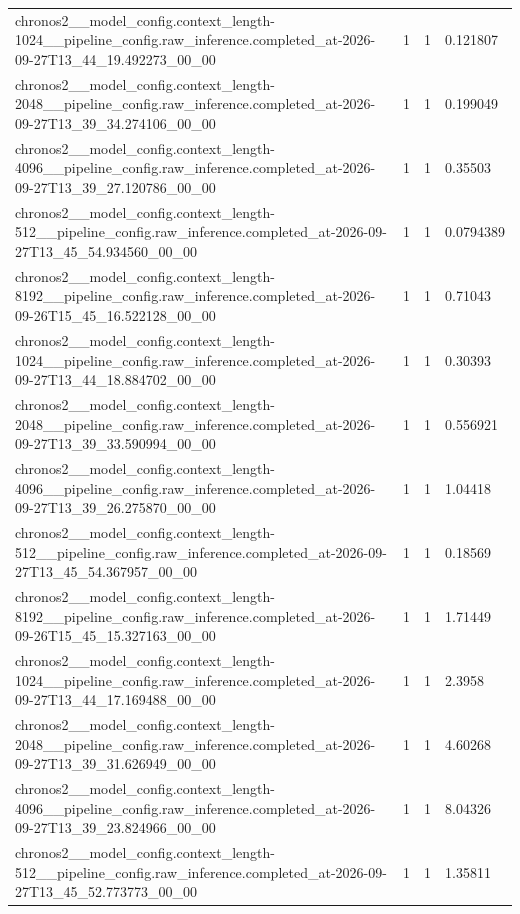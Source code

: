 \begin{tabular}{llll}
chronos2\_\_model\_config.context\_length-1024\_\_pipeline\_config.raw\_inference.completed\_at-2026-09-27T13\_44\_19.492273\_00\_00 & 1 & 1 & 0.121807 \\
chronos2\_\_model\_config.context\_length-2048\_\_pipeline\_config.raw\_inference.completed\_at-2026-09-27T13\_39\_34.274106\_00\_00 & 1 & 1 & 0.199049 \\
chronos2\_\_model\_config.context\_length-4096\_\_pipeline\_config.raw\_inference.completed\_at-2026-09-27T13\_39\_27.120786\_00\_00 & 1 & 1 & 0.35503 \\
chronos2\_\_model\_config.context\_length-512\_\_pipeline\_config.raw\_inference.completed\_at-2026-09-27T13\_45\_54.934560\_00\_00 & 1 & 1 & 0.0794389 \\
chronos2\_\_model\_config.context\_length-8192\_\_pipeline\_config.raw\_inference.completed\_at-2026-09-26T15\_45\_16.522128\_00\_00 & 1 & 1 & 0.71043 \\
chronos2\_\_model\_config.context\_length-1024\_\_pipeline\_config.raw\_inference.completed\_at-2026-09-27T13\_44\_18.884702\_00\_00 & 1 & 1 & 0.30393 \\
chronos2\_\_model\_config.context\_length-2048\_\_pipeline\_config.raw\_inference.completed\_at-2026-09-27T13\_39\_33.590994\_00\_00 & 1 & 1 & 0.556921 \\
chronos2\_\_model\_config.context\_length-4096\_\_pipeline\_config.raw\_inference.completed\_at-2026-09-27T13\_39\_26.275870\_00\_00 & 1 & 1 & 1.04418 \\
chronos2\_\_model\_config.context\_length-512\_\_pipeline\_config.raw\_inference.completed\_at-2026-09-27T13\_45\_54.367957\_00\_00 & 1 & 1 & 0.18569 \\
chronos2\_\_model\_config.context\_length-8192\_\_pipeline\_config.raw\_inference.completed\_at-2026-09-26T15\_45\_15.327163\_00\_00 & 1 & 1 & 1.71449 \\
chronos2\_\_model\_config.context\_length-1024\_\_pipeline\_config.raw\_inference.completed\_at-2026-09-27T13\_44\_17.169488\_00\_00 & 1 & 1 & 2.3958 \\
chronos2\_\_model\_config.context\_length-2048\_\_pipeline\_config.raw\_inference.completed\_at-2026-09-27T13\_39\_31.626949\_00\_00 & 1 & 1 & 4.60268 \\
chronos2\_\_model\_config.context\_length-4096\_\_pipeline\_config.raw\_inference.completed\_at-2026-09-27T13\_39\_23.824966\_00\_00 & 1 & 1 & 8.04326 \\
chronos2\_\_model\_config.context\_length-512\_\_pipeline\_config.raw\_inference.completed\_at-2026-09-27T13\_45\_52.773773\_00\_00 & 1 & 1 & 1.35811 \\

\end{tabular}
